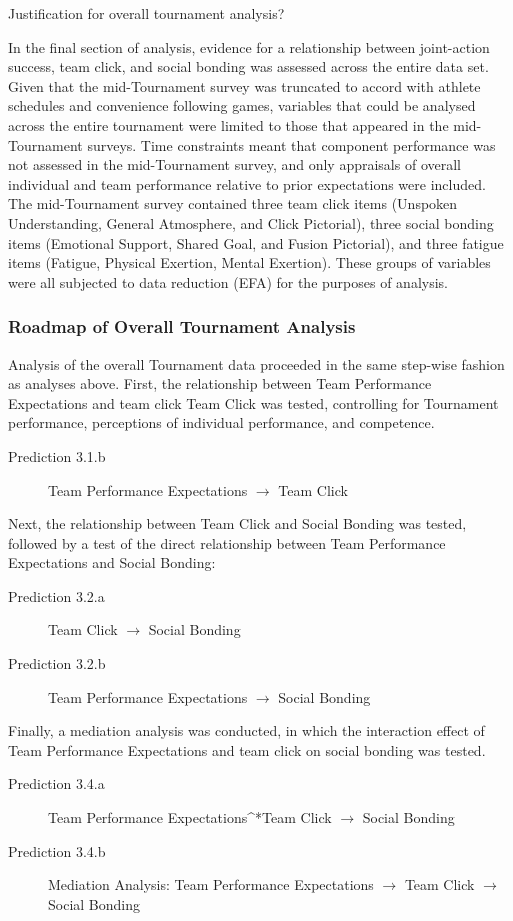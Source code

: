 
Justification for overall tournament analysis?

In the final section of analysis, evidence for a relationship between joint-action success, team click, and social bonding was assessed across the entire data set. Given that the mid-Tournament survey was truncated to accord with athlete schedules and convenience following games, variables that could be analysed across the entire tournament were limited to those that appeared in the mid-Tournament surveys. Time constraints meant that component performance was not assessed in the mid-Tournament survey, and only appraisals of overall individual and team performance relative to prior expectations were included. The mid-Tournament survey contained three team click items (Unspoken Understanding, General Atmosphere, and Click Pictorial), three social bonding items (Emotional Support, Shared Goal, and Fusion Pictorial), and three fatigue items (Fatigue, Physical Exertion, Mental Exertion). These groups of variables were all subjected to data reduction (EFA) for the purposes of analysis.



\subsubsection{Roadmap of Overall Tournament Analysis}
Analysis of the overall Tournament data proceeded in the same step-wise fashion as analyses above. First, the relationship between Team Performance Expectations and team click Team Click was tested, controlling for Tournament performance, perceptions of individual performance, and competence.

\begin{description}
  \item [Prediction 3.1.b] Team Performance Expectations $\rightarrow$ Team Click
\end{description}

Next, the relationship between Team Click and Social Bonding was tested, followed by a test of the direct relationship between Team Performance Expectations and Social Bonding:

\begin{description}
  \item [Prediction 3.2.a] Team Click $\rightarrow$ Social Bonding
  \item [Prediction 3.2.b] Team Performance Expectations $\rightarrow$ Social Bonding
\end{description}
\bigskip
Finally, a mediation analysis was conducted, in which the interaction effect of Team Performance Expectations and team click on social bonding was tested.
\bigskip
\begin{description}
\item[Prediction 3.4.a] Team Performance Expectations^*Team Click  $\rightarrow$ Social Bonding
\item[Prediction 3.4.b] Mediation Analysis: Team Performance Expectations $\rightarrow$ Team Click $\rightarrow$ Social Bonding
\end{description}
\clearpage





